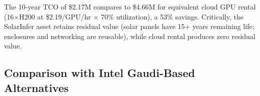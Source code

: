 \documentclass[conference,10pt,letterpaper]{IEEEtran}
\begin{document}
\begin{table}[!t]
\caption{10-Year TCO Projection: Edge SKU}
\label{tab:tco10}
\centering\scriptsize
{}
\end{table}

The 10-year TCO of \$2.17M compares to \$4.66M for equivalent cloud GPU rental (16$\times$H200 at \$2.19/GPU/hr $\times$ 70\% utilization), a 53\% savings. Critically, the SolarInfer asset retains residual value (solar panels have 15+ years remaining life; enclosures and networking are reusable), while cloud rental produces zero residual value.

\subsection{Comparison with Intel Gaudi-Based Alternatives}
\end{document}
